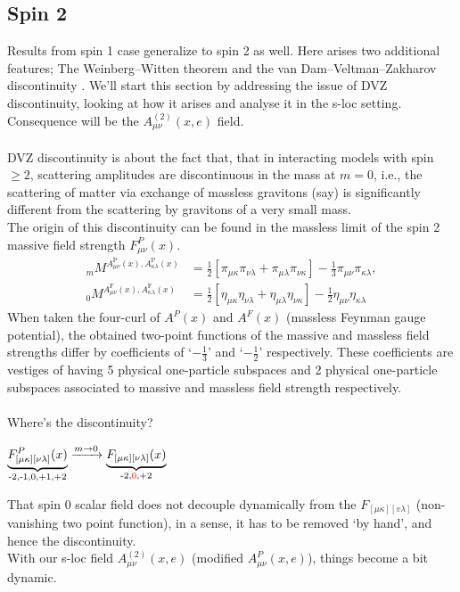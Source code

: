 \documentclass[12pt,a4paper]{article}
\numberwithin{equation}{section}
\begin{document}
\subsection{Spin 2}
Results from spin 1 case generalize to spin 2 as well. Here arises two additional features; The Weinberg–Witten theorem and the van Dam–Veltman–Zakharov discontinuity \cite{Mund_2017}\cite{2017NuPhB.924..699M}\cite{Zakharov:1970cc}\cite{VANDAM1970397}. We'll start this section by addressing the issue of DVZ discontinuity, looking at how it arises and analyse it in the s-loc setting. Consequence will be the $A^{(2)}_{\mu\nu}(x,e)$ field. 
\\\\
DVZ discontinuity is about the fact that, that in interacting models with spin$\geq2$, scattering amplitudes are discontinuous in the mass at $m=0$, i.e., the scattering of matter via exchange of  massless gravitons (say) is significantly different from the scattering by gravitons of a very small mass.    \\
The origin of this discontinuity can be found in the massless limit of  the spin 2 massive field strength $F^P_{\mu\nu}(x)$. 
\begin{align}
{ }_{m} M^{A_{\mu \nu}^{\mathrm{P}}(x), A_{\kappa \lambda}^{\mathrm{P}}(x)}&=\frac{1}{2}\left[\pi_{\mu \kappa} \pi_{\nu \lambda}+\pi_{\mu \lambda} \pi_{\nu \kappa}\right]-\frac{1}{3} \pi_{\mu \nu} \pi_{\kappa \lambda},
\\ \label{eq:3.1112}
{}_0 M^{A_{\mu \nu}^{\mathrm{F}}(x), A_{\kappa \lambda}^{\mathrm{F}}(x)}&=\frac{1}{2}\left[\eta_{\mu \kappa} \eta_{\nu \lambda}+\eta_{\mu \lambda} \eta_{\nu \kappa}\right]-\frac{1}{2} \eta_{\mu \nu} \eta_{\kappa \lambda}
\end{align}   
When taken the four-curl of $A^P(x)$ and $A^F(x)$ (massless Feynman gauge potential), the obtained two-point functions of the massive and massless field strengths differ by coefficients of `$-\frac{1}{3}$' and `$-\frac{1}{2}$' respectively. These coefficients are vestiges of having 5 physical one-particle subspaces and 2 physical one-particle subspaces associated to massive and massless field strength respectively. \\\\
Where's the discontinuity?
\begin{center}
$\underbrace{F^P_{[\mu \kappa][\nu \lambda]}(x)}_\text{-2,-1,0,+1,+2}\xrightarrow{m\rightarrow0}\underbrace{F_{[\mu \kappa][\nu \lambda]}(x)}_\text{-2,\textcolor{red}{0},+2}$
\end{center}
That spin 0 scalar field does not decouple dynamically from the $F_{[\mu \kappa][v \lambda]}$ (non-vanishing two point function), in a sense, it has to be removed `by hand', and hence the discontinuity. \\
With our s-loc field $A^{(2)}_{\mu\nu}(x,e)$ (modified $A^P_{\mu\nu}(x,e)$), things become a bit dynamic.    
\end{document}
